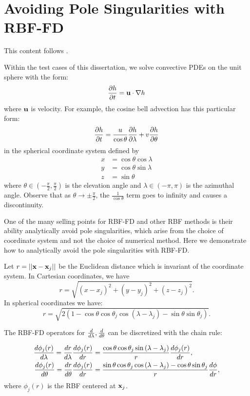\chapter{Avoiding Pole Singularities with RBF-FD}
This content follows \cite{FlyerWright07}. 

Within the test cases of this dissertation, we solve convective PDEs on the unit sphere with the form: 
$$
\frac{\partial h}{\partial t} = \mathbf{u} \cdot \nabla h
$$
where $\mathbf{u}$ is velocity. For example, the cosine bell advection has this particular form:
\begin{equation}
\frac{\partial h}{\partial t} = \frac{u}{\cos{\theta}} \frac{\partial h}{\partial \lambda} + v \frac{\partial h}{\partial \theta} \label{eq:cosine_bell_appendix}
\end{equation}
in the spherical coordinate system defined by
\begin{align*}
x & = \cos{\theta}\cos{\lambda} \\
y & = \cos{\theta}\sin{\lambda} \\
z & = \sin{\theta}
\end{align*}
where $\theta \in (-\frac{\pi}{2}, \frac{\pi}{2})$ is the elevation angle and $\lambda \in (-\pi,\pi)$ is the azimuthal angle.
Observe that as $\theta \rightarrow \pm \frac{\pi}{2}$, the $\frac{1}{\cos{\theta}}$ term goes to infinity and causes a discontinuity. 

One of the many selling points for RBF-FD and other RBF methods is their ability analytically avoid pole singularities, which arise from the choice of coordinate system and not the choice of numerical method. 
Here we demonstrate how to analytically avoid the pole singularities with RBF-FD.  


Let $r = || \mathbf{x} - \mathbf{x}_j ||$ be the Euclidean distance which is invariant of the coordinate system. In Cartesian coordinates, we have
$$
r = \sqrt{(x-x_j)^2 + (y-y_j)^2 + (z-z_j)^2}.
$$
In spherical coordinates we have:
$$
r = \sqrt{2(1-\cos{\theta}\cos{\theta_j}\cos{(\lambda-\lambda_j)} - \sin{\theta}\sin{\theta_j})}.
$$

The RBF-FD operators for $\frac{d }{d \lambda}, \frac{d }{d \theta}$ can be discretized with the chain rule: 

\begin{align}
\frac{d \phi_{j}(r)}{d \lambda} = \frac{d r}{d \lambda} \frac{d \phi_{j}(r)}{d r} & = \frac{\cos{\theta}\cos{\theta_j}\sin{(\lambda - \lambda_j)}}{r} \frac{d \phi_j(r)}{d r}, \label{eq:rbfffd_d_dlambda} \\
\frac{d \phi_{j}(r)}{d \theta} = \frac{d r}{d \theta} \frac{d \phi_{j}(r)}{d r} & = \frac{\sin{\theta}\cos{\theta_j}\cos{(\lambda-\lambda_j)} - \cos{\theta}\sin{\theta_j}}{r} \frac{d \phi}{d r}, \label{eq:rbfffd_d_dtheta}
\end{align}
where $\phi_{j}(r)$ is the RBF centered at $\mathbf{x}_{j}$. 

